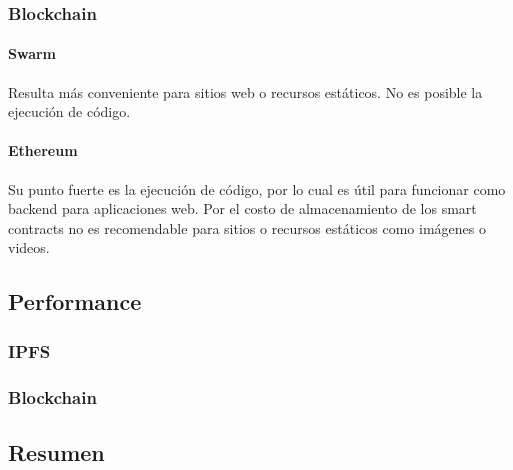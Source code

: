 \subsubsection{Blockchain}

\paragraph{Swarm}
Resulta más conveniente para sitios web o recursos estáticos. No es posible la ejecución de código.

\paragraph{Ethereum}
Su punto fuerte es la ejecución de código, por lo cual es útil para funcionar como backend para aplicaciones web. Por el costo de almacenamiento de los smart contracts no es recomendable para sitios o recursos estáticos como imágenes o videos.

\subsection{Performance}

\subsubsection{IPFS}

\subsubsection{Blockchain}

\subsection{Resumen}

